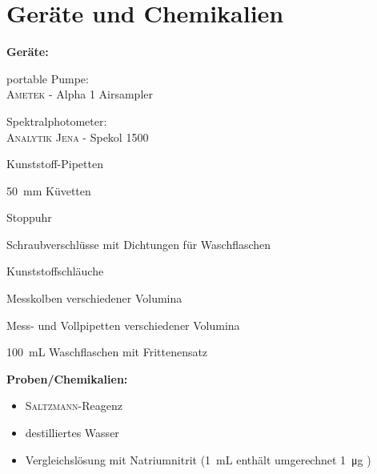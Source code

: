 \section{Geräte und Chemikalien}
\label{sec:geraete}

\textbf{Geräte:}
\begin{itemize}
	\begin{minipage}{0.49\textwidth}
		\item portable Pumpe: \\
		\textsc{Ametek} - Alpha 1 Airsampler
		\item Spektralphotometer: \\
		\textsc{Analytik Jena} - Spekol 1500
		\item Kunststoff-Pipetten
		\item \SI{50}{\milli \meter} Küvetten
		\item Stoppuhr
	\end{minipage}
	\hfill
	\begin{minipage}{0.49\textwidth}
		\item Schraubverschlüsse mit Dichtungen für Waschflaschen
		\item Kunststoffschläuche
		\item Messkolben verschiedener Volumina
		\item Mess- und Vollpipetten verschiedener Volumina
		\item \SI{100}{\milli \liter} Waschflaschen mit Frittenensatz
	\end{minipage}
\end{itemize}
\vspace*{5mm}
\textbf{Proben/Chemikalien:}
\begin{itemize}
		\item \textsc{Saltzmann}-Reagenz
		\item destilliertes Wasser
		\item Vergleichslösung mit Natriumnitrit (\SI{1}{\milli \liter} enthält umgerechnet \SI{1}{\micro \gram} )
\end{itemize}



